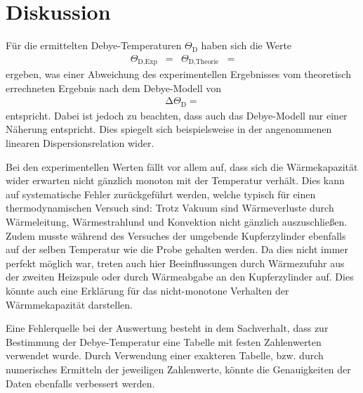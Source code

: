 \section{Diskussion}
\label{sec:Diskussion}

Für die ermittelten Debye-Temperaturen $\Theta_\text{D}$ haben sich die Werte
\begin{align*}
  \Theta_{\text{D,Exp}} &=  & \Theta_{\text{D,Theorie}} &= 
\end{align*}
ergeben, was einer Abweichung des experimentellen Ergebnisses vom theoretisch errechneten Ergebnis nach dem Debye-Modell von
\begin{align*}
  \increment \Theta_\text{D} = 
\end{align*}
entspricht.
Dabei ist jedoch zu beachten, dass auch das Debye-Modell nur einer Näherung entspricht.
Dies spiegelt sich beispielsweise in der angenommenen linearen Dispersionsrelation wider.

Bei den experimentellen Werten fällt vor allem auf, dass sich die Wärmekapazität wider erwarten nicht gänzlich monoton mit der Temperatur verhält.
Dies kann auf systematische Fehler zurückgeführt werden, welche typisch für einen thermodynamischen Versuch sind:
Trotz Vakuum sind Wärmeverluste durch Wärmeleitung, Wärmestrahlund und Konvektion nicht gänzlich auszuschließen.
Zudem musste während des Versuches der umgebende Kupferzylinder ebenfalls auf der selben Temperatur wie die Probe gehalten werden.
Da dies nicht immer perfekt möglich war, treten auch hier Beeinflussungen durch Wärmezufuhr aus der zweiten Heizspule oder durch Wärmeabgabe an den Kupferzylinder auf.
Dies könnte auch eine Erklärung für das nicht-monotone Verhalten der Wärmmekapazität darstellen.

Eine Fehlerquelle bei der Auswertung besteht in dem Sachverhalt, dass zur Bestimmung der Debye-Temperatur eine Tabelle mit festen Zahlenwerten verwendet wurde.
Durch Verwendung einer exakteren Tabelle, bzw. durch numerisches Ermitteln der jeweiligen Zahlenwerte, könnte die Genauigkeiten der Daten ebenfalls verbessert werden.
